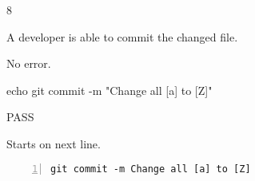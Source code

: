 \begin{description}[align=right,leftmargin=3.2cm,labelindent=3.0cm]
\item[Step:] 8
\item[Confirm:] A developer is able to commit the changed file.
\item[Expectation:] No error.
\item[Command:] echo git  commit -m "Change all [a] to [Z]"
\item[Test Result:] PASS
\item[Evidence:] Starts on next line.
\end{description}
\begin{lstlisting}[numbers=left]
git commit -m Change all [a] to [Z]

\end{lstlisting}

